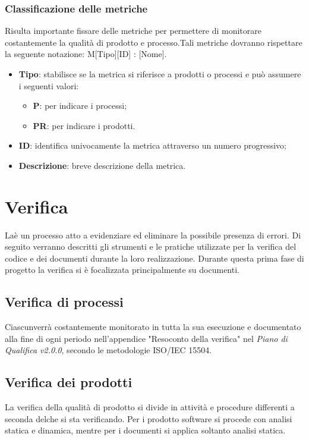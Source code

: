 \subsubsection{Classificazione delle metriche}
Risulta importante fissare delle metriche per permettere di monitorare costantemente la qualità di prodotto e processo.Tali metriche dovranno rispettare la seguente notazione:
M[Tipo][ID] : [Nome].\\
\begin{itemize}
	\item \textbf{Tipo}: stabilisce se la metrica si riferisce a prodotti o processi e può assumere i seguenti valori:
	\begin{itemize}
		\item \textbf{P}: per indicare i processi;
		\item \textbf{PR}: per indicare i prodotti.
	\end{itemize}
	\item \textbf{ID}: identifica univocamente la metrica attraverso un numero progressivo;
	\item \textbf{Descrizione}: breve descrizione della metrica.
\end{itemize}

\section{Verifica}
\label{Verifica}
Laè un processo atto a evidenziare ed eliminare la possibile presenza di errori.
Di seguito verranno descritti gli strumenti e le pratiche utilizzate per la verifica del codice e dei documenti durante la loro realizzazione.
Durante questa prima fase di progetto la verifica si è focalizzata principalmente su documenti.
\subsection{Verifica di processi}
Ciascunverrà costantemente monitorato in tutta la sua esecuzione e documentato alla fine di ogni periodo nell'appendice "Resoconto della verifica" nel \textit{Piano di Qualifica v2.0.0}, secondo le metodologie ISO/IEC 15504.

\subsection{Verifica dei prodotti}
La verifica della qualità di prodotto si divide in attività e procedure differenti a seconda delche si sta verificando. Per i prodotto software si procede con analisi statica e dinamica, mentre per i documenti si applica soltanto analisi statica.

